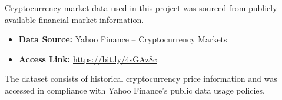 \documentclass[12pt,a4paper]{report}
\begin{document}
Cryptocurrency market data used in this project was sourced from publicly available financial market information.

\begin{itemize}
    \item \textbf{Data Source:} Yahoo Finance – Cryptocurrency Markets
    \item \textbf{Access Link:} \url{https://bit.ly/4sGAz8c}
\end{itemize}

The dataset consists of historical cryptocurrency price information and was accessed in compliance with Yahoo Finance’s public data usage policies.
\end{document}
